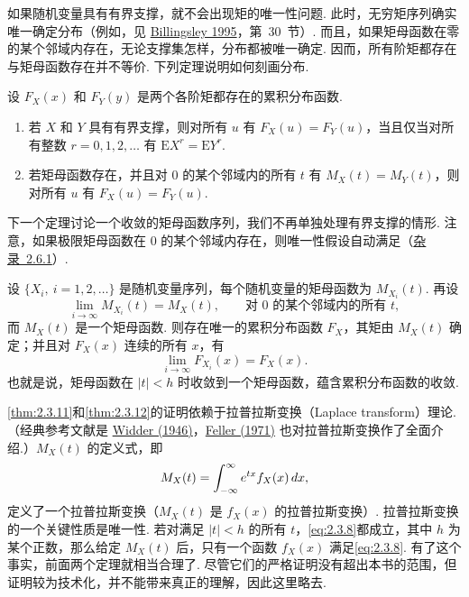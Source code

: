 如果随机变量具有有界支撑，就不会出现矩的唯一性问题. 此时，无穷矩序列确实唯一确定分布（例如，见 \hyperref[bib:source33]{Billingsley 1995}，第~30~节）. 而且，如果矩母函数在零的某个邻域内存在，无论支撑集怎样，分布都被唯一确定. 因而，所有阶矩都存在与矩母函数存在并不等价. 下列定理说明如何刻画分布.
\begin{theorem}\label{thm:2.3.11}
设 $F_X(x)$ 和 $F_Y(y)$ 是两个各阶矩都存在的累积分布函数.
\begin{enumerate}
\item[(a)] 若 $X$ 和 $Y$ 具有有界支撑，则对所有 $u$ 有 $F_X(u)=F_Y(u)$，当且仅当对所有整数 $r=0,1,2,\ldots$ 有 $\mathrm EX^r=\mathrm EY^r$.
\item[(b)] 若矩母函数存在，并且对 $0$ 的某个邻域内的所有 $t$ 有 $M_X(t)=M_Y(t)$，则对所有 $u$ 有 $F_X(u)=F_Y(u)$.
\end{enumerate}
\end{theorem}
下一个定理讨论一个收敛的矩母函数序列，我们不再单独处理有界支撑的情形. 注意，如果极限矩母函数在 $0$ 的某个邻域内存在，则唯一性假设自动满足（\hyperref[sec:2.6.1]{杂录~2.6.1}）.
\begin{theorem}[矩母函数的收敛]\label{thm:2.3.12}
设 $\{X_i,\ i=1,2,\ldots\}$ 是随机变量序列，每个随机变量的矩母函数为 $M_{X_i}(t)$. 再设
$$\lim_{i\to\infty}M_{X_i}(t)=M_X(t),\qquad\text{对 $0$ 的某个邻域内的所有 $t$},$$
而 $M_X(t)$ 是一个矩母函数. 则存在唯一的累积分布函数 $F_X$，其矩由 $M_X(t)$ 确定；并且对 $F_X(x)$ 连续的所有 $x$，有
$$\lim_{i\to\infty}F_{X_i}(x)=F_X(x).$$
也就是说，矩母函数在 $|t|<h$ 时收敛到一个矩母函数，蕴含累积分布函数的收敛.
\end{theorem}
\autoref{thm:2.3.11}和\autoref{thm:2.3.12}的证明依赖于拉普拉斯变换（Laplace transform）理论. （经典参考文献是 \hyperref[bib:source329]{Widder (1946)}，\hyperref[bib:source119]{Feller (1971)} 也对拉普拉斯变换作了全面介绍.）$M_X(t)$ 的定义式，即
\begin{equation}\label{eq:2.3.8}\index{SI0601@拉普拉斯变换}
M_X(t)=\int_{-\infty}^\infty e^{tx}f_X(x)\,dx,
\end{equation}
定义了一个拉普拉斯变换（$M_X(t)$ 是 $f_X(x)$ 的拉普拉斯变换）. 拉普拉斯变换的一个关键性质是唯一性. 若对满足 $|t|<h$ 的所有 $t$，\eqref{eq:2.3.8}都成立，其中 $h$ 为某个正数，那么给定 $M_X(t)$ 后，只有一个函数 $f_X(x)$ 满足\eqref{eq:2.3.8}. 有了这个事实，前面两个定理就相当合理了. 尽管它们的严格证明没有超出本书的范围，但证明较为技术化，并不能带来真正的理解，因此这里略去.

